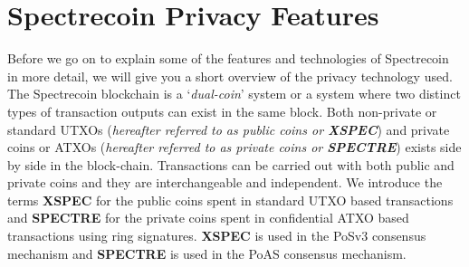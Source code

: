 \section{Spectrecoin Privacy Features}
Before we go on to explain some of the features and technologies of
Spectrecoin in more detail, we will give you a short overview of the
privacy technology used. The Spectrecoin blockchain is a ‘\textit{dual-coin}’
system or a system where two distinct types of transaction outputs can
exist in the same block. Both non-private or standard UTXOs (\textit{hereafter
referred to as public coins or \textbf{XSPEC}}) and private coins or ATXOs 
(\textit{hereafter referred to as private coins or \textbf{SPECTRE}}) exists 
side by side in the block-chain. Transactions can be carried out with both 
public and private coins and they are interchangeable and independent. We 
introduce the terms \textbf{XSPEC} for the public coins spent in standard UTXO based 
transactions and \textbf{SPECTRE} for the private coins spent in  confidential ATXO based
transactions using ring signatures. \textbf{XSPEC} is used in the PoSv3 consensus
mechanism and \textbf{SPECTRE} is used in the PoAS consensus mechanism.



